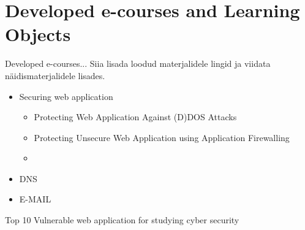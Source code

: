 \section{Developed e-courses and Learning Objects}
\label{Developed e-courses and Learning Objects}
Developed e-courses...
{\color{red} Siia lisada loodud materjalidele lingid ja viidata näidismaterjalidele lisades.}
\begin{itemize}
	\item Securing web application
		\begin{itemize}
			\item Protecting Web Application Against (D)DOS Attacks
			\item Protecting Unsecure Web Application using Application Firewalling
			\item 
		\end{itemize}
	\item DNS
	\item E-MAIL
\end{itemize}

Top 10 Vulnerable web application for studying cyber security \cite{10VulnerApps}
